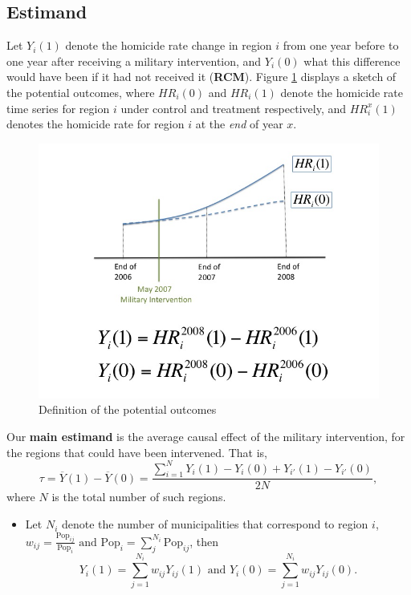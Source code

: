 \documentclass{article}[11 pt]
\begin{document}
\subsection{Estimand}
		        Let $Y_i(1)$ denote the homicide rate change in region $i$ from one year before to one year after receiving a military intervention, and $Y_i(0)$ what this difference would have been if it had not received it (\textbf{RCM}). Figure \ref{responseDef} displays a sketch of the potential outcomes, where $HR_i(0)$ and $HR_i(1)$ denote the homicide rate time series for region $i$ under control and treatment respectively, and $HR_i^{x}(1)$ denotes the homicide rate for region $i$ at the \emph{end} of year $x$.
		
		
				\begin{figure}[htdp]
					\centering
				      \includegraphics[scale=0.3]{Images/ResponseDef/Slide1.jpg}
				      \caption{Definition of the potential outcomes}
				\label{responseDef}
				\end{figure}
		  		Our \textbf{ main estimand} is the average causal effect of the military intervention, for the regions that could have been intervened. That is, $$\tau=\overline{Y}(1)-\overline{Y}(0)=\frac{ \sum_{i=1}^{N} Y_i(1)-Y_i(0)+ Y_{i'}(1)-Y_{i'}(0)}{2N},$$ where $N$ is the total number of such regions.
				\begin{itemize}
					   \item Let $N_i$ denote the number of municipalities that correspond to region $i$, $w_{ij}= \frac{\textrm{Pop}_{ij}}{\textrm{Pop}_{i}} \textrm{ and  }\textrm{Pop}_{i}= \sum_j^{N_i}\textrm{Pop}_{ij}$, then 
						$$Y_i(1) = \sum_{j=1}^{N_i}w_{ij}Y_{ij}(1) \textrm{ and } Y_i(0) = \sum_{j=1}^{N_i}w_{ij}Y_{ij}(0).$$						
				\end{itemize}
\end{document}
